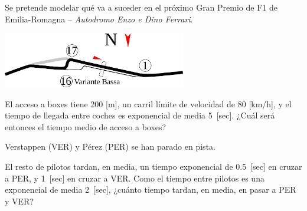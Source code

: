 \documentclass{upmassignment}
\date{\today}
\begin{document}
Se pretende modelar qué va a suceder en
el próximo Gran Premio de F1 de
Emilia-Romagna --
\textit{Autodromo Enzo e Dino Ferrari}.

\vspace{1em}

\begin{minipage}{\textwidth}
    \centering
    \includegraphics[width=0.6\textwidth]{figs/box-pitlane.pdf}
\end{minipage}

\begin{problemlist}
    \pbitem El acceso a boxes tiene
    200 [m], un carril
    límite de velocidad de
    80 [km/h], y el tiempo de llegada
    entre coches es exponencial de media
    5~[sec]. ¿Cuál será entonces el tiempo
    medio de acceso a boxes?

    \begin{solucion}
        
    \end{solucion}


    \pbitem Verstappen (VER)
    y Pérez (PER) se han parado en pista.

    \vspace{1em}
    \vspace{1em}

    El resto de pilotos 
    tardan, en media, un tiempo exponencial de
    0.5~[sec] en cruzar a PER, y 1~[sec] en
    cruzar a VER. Como el
    tiempo entre pilotos es una
    exponencial de media 2~[sec], ¿cuánto
    tiempo tardan, en media, en pasar a
    PER y VER?


\end{problemlist}
\end{document}
